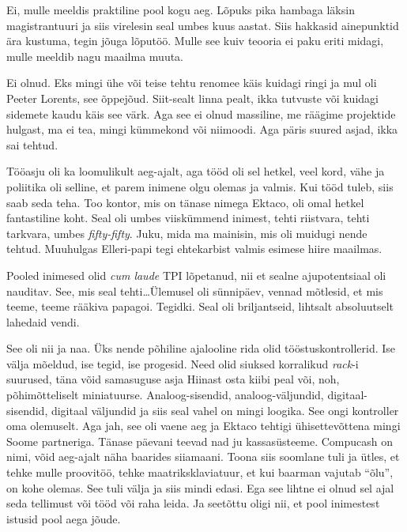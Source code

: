 
Ei, mulle meeldis praktiline pool kogu aeg. Lõpuks pika hambaga läksin 
magistrantuuri ja siis virelesin seal umbes kuus aastat. Siis hakkasid 
ainepunktid  ära kustuma, tegin jõuga lõputöö. Mulle see kuiv teooria ei paku 
eriti midagi, mulle meeldib nagu maailma muuta. 


Ei olnud. Eks mingi ühe või teise tehtu renomee käis kuidagi ringi ja mul oli 
Peeter Lorents, see õppejõud. Siit-sealt linna 
pealt,  ikka tutvuste  või kuidagi sidemete kaudu käis see värk. Aga see ei 
olnud massiline, me räägime projektide hulgast, ma ei tea, mingi kümmekond või 
niimoodi. Aga päris suured asjad, ikka sai tehtud.

Tööasju oli ka loomulikult aeg-ajalt, aga tööd oli sel hetkel, veel kord, vähe 
ja poliitika oli selline, et parem inimene olgu olemas ja valmis. Kui tööd 
tuleb, siis saab seda teha. Too  kontor, mis on tänase nimega 
Ektaco, oli omal hetkel  fantastiline koht. Seal oli umbes 
viiskümmend inimest, tehti riistvara, tehti tarkvara, umbes \emph{fifty-fifty}. 
Juku, mida ma mainisin, mis oli muidugi nende tehtud. Muuhulgas Elleri-papi 
tegi ehtekarbist valmis esimese hiire maailmas.

Pooled inimesed olid \emph{cum laude} TPI lõpetanud, nii et sealne 
ajupotentsiaal oli nauditav. See, mis seal tehti\ldots Ülemusel oli sünnipäev, 
vennad mõtlesid, et mis teeme, teeme rääkiva papagoi. Tegidki. Seal oli 
briljantseid, lihtsalt absoluutselt lahedaid vendi. 


See oli nii ja naa. Üks nende põhiline ajalooline rida olid 
tööstuskontrollerid. Ise välja mõeldud, ise tegid, ise progesid. Need olid 
siuksed korralikud \emph{rack}-i suurused, täna võid samasuguse asja  Hiinast 
osta kiibi peal või, noh, põhimõtteliselt miniatuurse. Analoog-sisendid, 
analoog-väljundid, digitaal-sisendid, digitaal väljundid ja siis seal vahel on 
mingi loogika. See ongi kontroller oma olemuselt. Aga jah, see oli vaene aeg ja 
 Ektaco tehtigi ühisettevõttena mingi Soome partneriga. Tänase 
päevani teevad nad ju kassasüsteeme. Compucash on nimi, võid aeg-ajalt näha 
baarides siiamaani. Toona siis soomlane tuli ja ütles, et tehke mulle 
proovitöö, tehke  maatriksklaviatuur, et kui baarman vajutab \enquote{õlu}, on 
kohe olemas. See tuli välja ja siis mindi edasi. Ega see lihtne ei olnud sel 
ajal seda tellimust või tööd või raha leida. Ja  seetõttu oligi nii, et pool 
inimestest istusid pool  aega jõude. 


